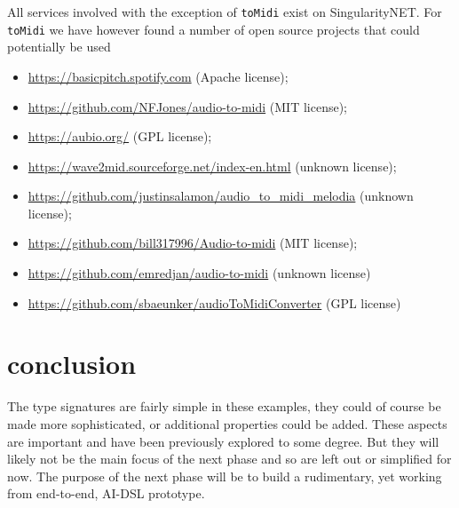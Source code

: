 \documentclass[]{article}
\begin{document}
All services involved with the exception of \texttt{toMidi} exist on
SingularityNET.  For \texttt{toMidi} we have however found a number of
open source projects that could potentially be used
\begin{itemize}
\item
  \href{https://basicpitch.spotify.com}{https://basicpitch.spotify.com}
  (Apache license);
\item
  \href{https://github.com/NFJones/audio-to-midi}{https://github.com/NFJones/audio-to-midi}
  (MIT license);
\item
  \href{https://github.com/NFJones/audio-to-midi}{https://aubio.org/}
  (GPL license);
\item
  \href{https://wave2mid.sourceforge.net/index-en.html}{https://wave2mid.sourceforge.net/index-en.html}
  (unknown license);
\item
  \href{https://github.com/justinsalamon/audio\_to\_midi\_melodia}{https://github.com/justinsalamon/audio\_to\_midi\_melodia}
  (unknown license);
\item
  \href{https://github.com/bill317996/Audio-to-midi}{https://github.com/bill317996/Audio-to-midi}
  (MIT license);
\item
  \href{https://github.com/emredjan/audio-to-midi}{https://github.com/emredjan/audio-to-midi}
  (unknown license)
\item
  \href{https://github.com/sbaeunker/audioToMidiConverter}{https://github.com/sbaeunker/audioToMidiConverter}
  (GPL license)
\end{itemize}

\section{conclusion}
The type signatures are fairly simple in these examples, they could of
course be made more sophisticated, or additional properties could be
added.  These aspects are important and have been previously explored
to some degree.  But they will likely not be the main focus of the
next phase and so are left out or simplified for now.  The purpose of
the next phase will be to build a rudimentary, yet working from
end-to-end, AI-DSL prototype.
\end{document}
